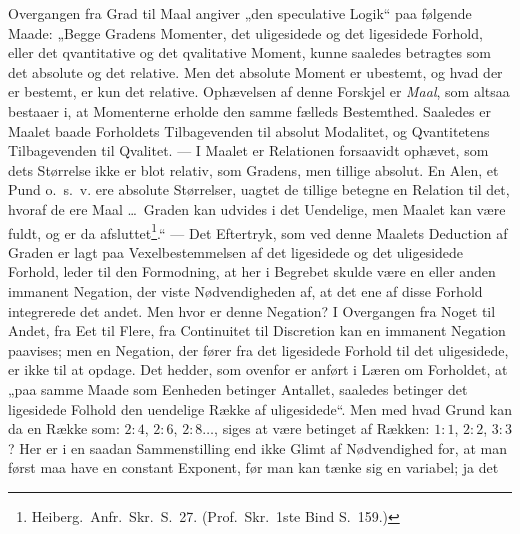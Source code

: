\documentclass[12pt]{book}
\newcommand{\opage}[1]{\marginnote{\footnotesize\textit{[#1]}}}
\begin{document}
Overgangen fra Grad til Maal angiver „den speculative Logik“ paa følgende Maade: „Begge Gradens
Momenter, det uligesidede og det ligesidede Forhold, eller det qvantitative og det qvalitative Moment,
kunne saaledes betragtes som det absolute og det relative. Men det absolute Moment er ubestemt, og hvad
der er bestemt, er kun det relative. Ophævelsen af denne Forskjel er \emph{Maal}, som altsaa bestaaer
i, at Momenterne erholde den samme fælleds Bestemthed. Saaledes er Maalet baade Forholdets Tilbagevenden
til absolut Modalitet, og Qvantitetens Tilbagevenden til Qvalitet. --- I Maalet er Relationen forsaavidt
ophævet, som dets Størrelse ikke er blot relativ, som Gradens, men tillige absolut. En Alen, et Pund
o.\ s.\ v. ere absolute Størrelser, uagtet de tillige betegne en Relation til det, hvoraf de ere Maal
\ldots\ Graden kan udvides i det Uendelige, men Maalet kan være
\opage{312} fuldt, og er da afsluttet\footnote{Heiberg.\ Anfr.\ Skr.\ S.~27. (Prof.\ Skr.\ 1ste Bind S.~159.)}.“
--- Det Eftertryk, som ved denne Maalets Deduction af Graden er lagt paa Vexelbestemmelsen af det
ligesidede og det uligesidede Forhold, leder til den Formodning, at her i Begrebet skulde være en eller
anden immanent Negation, der viste Nødvendigheden af, at det ene af disse Forhold integrerede det andet.
Men hvor er denne Negation? I Overgangen fra Noget til Andet, fra Eet til Flere, fra Continuitet til
Discretion kan en immanent Negation paavises; men en Negation, der fører fra det ligesidede Forhold til
det uligesidede, er ikke til at opdage. Det hedder, som ovenfor er anført i Læren om Forholdet, at „paa
samme Maade som Eenheden betinger Antallet, saaledes betinger det ligesidede Folhold den uendelige Række
af uligesidede“. Men med hvad Grund kan da en Række som: $2 : 4$, $2 : 6$, $2 : 8 \ldots$, siges at være
betinget af Rækken: $1 : 1$, $2 : 2$, $3 : 3$? Her er i en saadan Sammenstilling end ikke Glimt af
Nødvendighed for, at man først maa have en constant Exponent, før man kan tænke sig en variabel; ja det
\end{document}

